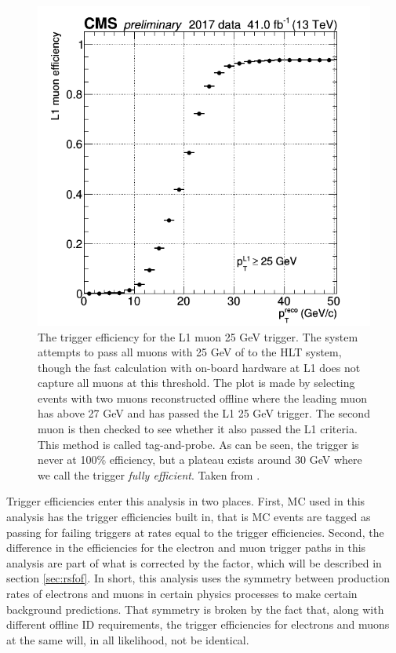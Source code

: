     \begin{figure}[h!]
      \centering
      \includegraphics[width=.7\textwidth]{figures/muon_l1_eff.png}
      \caption{The trigger efficiency for the L1 muon 25 GeV trigger. The system attempts to pass all muons with 25 GeV of \pt to the HLT system, though the fast calculation with on-board hardware at L1 does not capture all muons at this threshold. The plot is made by selecting events with two muons reconstructed offline where the leading \pt muon has \pt above 27 GeV and has passed the L1 25 GeV trigger. The second muon is then checked to see whether it also passed the L1 criteria. This method is called tag-and-probe. As can be seen, the trigger is never at 100\% efficiency, but a plateau exists around 30 GeV where we call the trigger \emph{fully efficient}. Taken from \cite{mu_l1_twiki}.}
      \label{fig:mu_l1_eff}
    \end{figure}

    Trigger efficiencies enter this analysis in two places. First, MC used in this analysis has the trigger efficiencies built in, that is MC events are tagged as passing for failing triggers at rates equal to the trigger efficiencies. Second, the difference in the efficiencies for the electron and muon trigger paths in this analysis are part of what is corrected by the \rsfof factor, which will be described in section \ref{sec:rsfof}. In short, this analysis uses the symmetry between production rates of electrons and muons in certain physics processes to make certain background predictions. That symmetry is broken by the fact that, along with different offline ID requirements, the trigger efficiencies for electrons and muons at the same \pt will, in all likelihood, not be identical.

